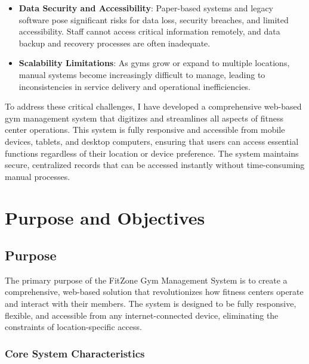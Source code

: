 \documentclass[12pt,a4paper]{report}
\begin{document}
\begin{itemize}[leftmargin=*]
    \item \textbf{Data Security and Accessibility}: Paper-based systems and legacy software pose significant risks for data loss, security breaches, and limited accessibility. Staff cannot access critical information remotely, and data backup and recovery processes are often inadequate.
    
    \item \textbf{Scalability Limitations}: As gyms grow or expand to multiple locations, manual systems become increasingly difficult to manage, leading to inconsistencies in service delivery and operational inefficiencies.
\end{itemize}

To address these critical challenges, I have developed a comprehensive web-based gym management system that digitizes and streamlines all aspects of fitness center operations. This system is fully responsive and accessible from mobile devices, tablets, and desktop computers, ensuring that users can access essential functions regardless of their location or device preference. The system maintains secure, centralized records that can be accessed instantly without time-consuming manual processes.

\section{Purpose and Objectives}
\label{sec:purpose-objectives}

\subsection{Purpose}

The primary purpose of the FitZone Gym Management System is to create a comprehensive, web-based solution that revolutionizes how fitness centers operate and interact with their members. The system is designed to be fully responsive, flexible, and accessible from any internet-connected device, eliminating the constraints of location-specific access.

\subsubsection{Core System Characteristics}
\end{document}
